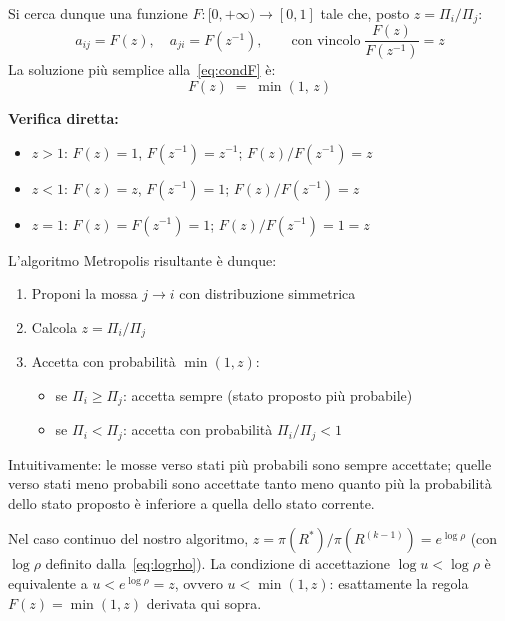 \documentclass[12pt,a4paper]{article}
\begin{document}
Si cerca dunque una funzione $F:[0,+\infty) \to [0,1]$ tale che, posto $z = \Pi_i/\Pi_j$:
\begin{equation}
  a_{ij} = F(z), \quad a_{ji} = F(z^{-1}), \qquad
  \text{con vincolo} \;\frac{F(z)}{F(z^{-1})} = z
  \label{eq:condF}
\end{equation}
La soluzione più semplice alla~\eqref{eq:condF} è:
\begin{equation}
  \boxed{F(z) \;=\; \min(1,\,z)}
  \label{eq:Fmin}
\end{equation}

\textbf{Verifica diretta:}
\begin{itemize}
  \item $z > 1$:\; $F(z) = 1$,\; $F(z^{-1}) = z^{-1}$;\; $F(z)/F(z^{-1}) = z$ \checkmark
  \item $z < 1$:\; $F(z) = z$,\; $F(z^{-1}) = 1$;\; $F(z)/F(z^{-1}) = z$ \checkmark
  \item $z = 1$:\; $F(z) = F(z^{-1}) = 1$;\; $F(z)/F(z^{-1}) = 1 = z$ \checkmark
\end{itemize}

L'algoritmo Metropolis risultante è dunque:
\begin{enumerate}
  \item Proponi la mossa $j \to i$ con distribuzione simmetrica
  \item Calcola $z = \Pi_i / \Pi_j$
  \item Accetta con probabilità $\min(1, z)$:
        \begin{itemize}
          \item se $\Pi_i \ge \Pi_j$: accetta sempre (stato proposto più probabile)
          \item se $\Pi_i < \Pi_j$: accetta con probabilità $\Pi_i/\Pi_j < 1$
        \end{itemize}
\end{enumerate}

Intuitivamente: le mosse verso stati più probabili sono sempre accettate; quelle verso
stati meno probabili sono accettate tanto meno quanto più la probabilità dello stato
proposto è inferiore a quella dello stato corrente.

\begin{osservazione}
Nel caso continuo del nostro algoritmo, $z = \pi(R^*)/\pi(R^{(k-1)}) = e^{\log\rho}$
(con $\log\rho$ definito dalla~\eqref{eq:logrho}). La condizione di accettazione
$\log u < \log\rho$ è equivalente a $u < e^{\log\rho} = z$, ovvero
$u < \min(1, z)$: esattamente la regola $F(z) = \min(1, z)$ derivata qui sopra.
\end{osservazione}
\end{document}
